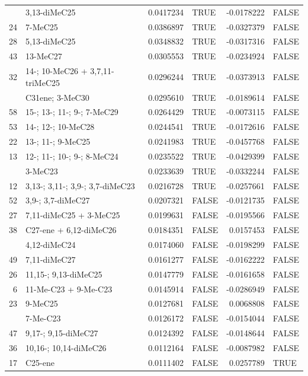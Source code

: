 \documentclass[
]{article}
\begin{document}
\begin{longtable}[t]{rlrlrl}
\endfoot
\bottomrule
\endlastfoot
31 & 3,13-diMeC25 & 0.0417234 & TRUE & -0.0178222 & FALSE\\
24 & 7-MeC25 & 0.0386897 & TRUE & -0.0327379 & FALSE\\
28 & 5,13-diMeC25 & 0.0348832 & TRUE & -0.0317316 & FALSE\\
43 & 13-MeC27 & 0.0305553 & TRUE & -0.0234924 & FALSE\\
32 & 14-; 10-MeC26 + 3,7,11-triMeC25 & 0.0296244 & TRUE & -0.0373913 & FALSE\\
\addlinespace
68 & C31ene; 3-MeC30 & 0.0295610 & TRUE & -0.0189614 & FALSE\\
58 & 15-; 13-; 11-; 9-; 7-MeC29 & 0.0264429 & TRUE & -0.0073115 & FALSE\\
53 & 14-; 12-; 10-MeC28 & 0.0244541 & TRUE & -0.0172616 & FALSE\\
22 & 13-; 11-; 9-MeC25 & 0.0241983 & TRUE & -0.0457768 & FALSE\\
13 & 12-; 11-; 10-; 9-; 8-MeC24 & 0.0235522 & TRUE & -0.0429399 & FALSE\\
\addlinespace
10 & 3-MeC23 & 0.0233639 & TRUE & -0.0332244 & FALSE\\
12 & 3,13-; 3,11-; 3,9-; 3,7-diMeC23 & 0.0216728 & TRUE & -0.0257661 & FALSE\\
52 & 3,9-; 3,7-diMeC27 & 0.0207321 & FALSE & -0.0121735 & FALSE\\
27 & 7,11-diMeC25 + 3-MeC25 & 0.0199631 & FALSE & -0.0195566 & FALSE\\
38 & C27-ene + 6,12-diMeC26 & 0.0184351 & FALSE & 0.0157453 & FALSE\\
\addlinespace
19 & 4,12-diMeC24 & 0.0174060 & FALSE & -0.0198299 & FALSE\\
49 & 7,11-diMeC27 & 0.0161277 & FALSE & -0.0162222 & FALSE\\
26 & 11,15-; 9,13-diMeC25 & 0.0147779 & FALSE & -0.0161658 & FALSE\\
6 & 11-Me-C23 + 9-Me-C23 & 0.0145914 & FALSE & -0.0286949 & FALSE\\
23 & 9-MeC25 & 0.0127681 & FALSE & 0.0068808 & FALSE\\
\addlinespace
7 & 7-Me-C23 & 0.0126172 & FALSE & -0.0154044 & FALSE\\
47 & 9,17-; 9,15-diMeC27 & 0.0124392 & FALSE & -0.0148644 & FALSE\\
36 & 10,16-; 10,14-diMeC26 & 0.0112164 & FALSE & -0.0087982 & FALSE\\
17 & C25-ene & 0.0111402 & FALSE & 0.0257789 & TRUE\\

\end{longtable}
\end{document}
